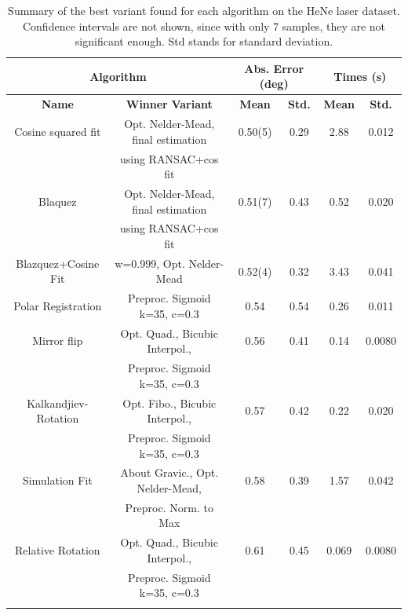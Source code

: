 \documentclass[11pt, a4paper, twoside]{article} %
\begin{document}
\begin{table}[h!]
\center
\caption{Summary of the best variant found for each algorithm on the HeNe laser dataset. Confidence intervals are not shown, since with only 7 samples, they are not significant enough. Std stands for standard deviation. }\label{tab:resExp}
\hspace{-0.1cm}\begin{tabular}{c|c|cc|cc}
\toprule
 \multicolumn{2}{c|}{\bf Algorithm} &  \multicolumn{2}{|c|}{\bf \small Abs. Error (deg)} & \multicolumn{2}{|c}{\bf Times (s)} \\ \midrule \midrule
{\bf                     Name} &                          {\bf Winner} {\bf Variant} &  {\bf Mean} &  {\bf Std.} & {\bf Mean} & {\bf Std.}\\
\bottomrule\rule{0pt}{4mm}{}
    Cosine squared fit &  {\small  Opt. Nelder-Mead, final estimation } &  0.50(5) &  0.29 &  2.88 &  0.012 \\
                       &                   {\small using RANSAC+cos fit }&          &         &          &          \\ \hline\rule{0pt}{4mm}{}
               Blaquez &  {\small  Opt. Nelder-Mead, final estimation } &  0.51(7) & 0.43 &  0.52 &  0.020 \\
                       &                   {\small using RANSAC+cos fit }&          &         &          &          \\ \hline\rule{0pt}{4mm}{}
   Blazquez+Cosine Fit &              {\small w=0.999, Opt. Nelder-Mead} &  0.52(4) & 0.32 &  3.43 &  0.041 \\ \hline\rule{0pt}{4mm}{}
    Polar Registration &     {\small      Preproc. Sigmoid k=35, c=0.3} &  0.54 & 0.54 &  0.26 &  0.011 \\ \hline\rule{0pt}{4mm}{}
           Mirror flip &     {\small    Opt. Quad., Bicubic Interpol., }&  0.56 & 0.41 &  0.14 &  0.0080 \\
                       &        {\small   Preproc. Sigmoid k=35, c=0.3 }&          &         &          &          \\ \hline\rule{0pt}{4mm}{}
  Kalkandjiev-Rotation &      {\small  Opt. Fibo., Bicubic Interpol.,}  &  0.57 & 0.42 &  0.22 &  0.020 \\
                       &          {\small Preproc. Sigmoid k=35, c=0.3 } &          &         &          &          \\ \hline\rule{0pt}{4mm}{}
        Simulation Fit & {\small About Gravic., Opt. Nelder-Mead,}  &  0.58 & 0.39 &  1.57 &  0.042 \\
                       &                  {\small Preproc. Norm. to Max }&          &         &          &          \\ \hline\rule{0pt}{4mm}{}
     Relative Rotation &    {\small     Opt. Quad., Bicubic Interpol.}, &  0.61 & 0.45 &  0.069 &  0.0080 \\
                       &      {\small     Preproc. Sigmoid k=35, c=0.3 }&          &         &          &          \\ \hline\rule{0pt}{4mm}{}
                       

\end{tabular}
\end{table}
\end{document}
